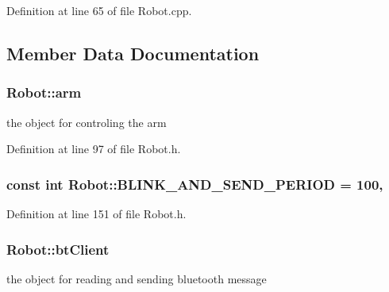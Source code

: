 Definition at line 65 of file Robot.\-cpp.



\subsection{Member Data Documentation}
\hypertarget{classRobot_a444673862cbe384992aceb066282b500}{
\subsubsection[{arm}]{ Robot\-::arm}}\label{classRobot_a444673862cbe384992aceb066282b500}


the object for controling the arm 



Definition at line 97 of file Robot.\-h.

\hypertarget{classRobot_ad0f5c1ce14363f3c05232eceab37ceff}{
\subsubsection[{B\-L\-I\-N\-K\-\_\-\-A\-N\-D\-\_\-\-S\-E\-N\-D\-\_\-\-P\-E\-R\-I\-O\-D}]{\setlength{\rightskip}{0pt plus 5cm}const int Robot\-::\-B\-L\-I\-N\-K\-\_\-\-A\-N\-D\-\_\-\-S\-E\-N\-D\-\_\-\-P\-E\-R\-I\-O\-D = 100\hspace{0.3cm}{\ttfamily [static]}, {\ttfamily [private]}}}\label{classRobot_ad0f5c1ce14363f3c05232eceab37ceff}


Definition at line 151 of file Robot.\-h.

\hypertarget{classRobot_a9da91e6d551ed02038e935b3c755cc75}{
\subsubsection[{bt\-Client}]{ Robot\-::bt\-Client}}\label{classRobot_a9da91e6d551ed02038e935b3c755cc75}


the object for reading and sending bluetooth message 



